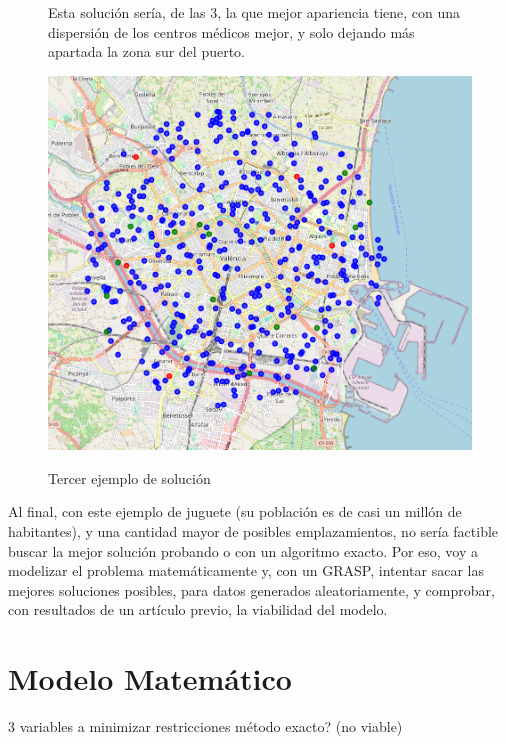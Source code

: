 \documentclass[12pt,a4paper]{book}
\begin{document}
\begin{figure}[H]
    \centering
    \begin{minipage}[c]{0.45\textwidth}
        Esta solución sería, de las 3, la que mejor apariencia tiene, con una dispersión de los centros médicos mejor, y solo dejando más apartada la zona sur del puerto.
    \end{minipage}
    \hfill
    \begin{minipage}[c]{0.45\textwidth}
        \includegraphics[width=\textwidth]{images/solucion_ejemplo_3.png}
        \label{fig:ejemplo_3}
    \end{minipage}
    \caption{Tercer ejemplo de solución}
\end{figure}

 Al final, con este ejemplo de juguete (su población es de casi un millón de habitantes), y una cantidad mayor de posibles emplazamientos, no sería factible buscar la mejor solución probando
 o con un algoritmo exacto. Por eso, voy a modelizar el problema matemáticamente y, con un GRASP, intentar sacar las mejores soluciones posibles, para datos generados aleatoriamente, y comprobar, 
 con resultados de un artículo previo, la viabilidad del modelo.

\section{Modelo Matemático}
3 variables a minimizar
restricciones
método exacto? (no viable)
\end{document}
